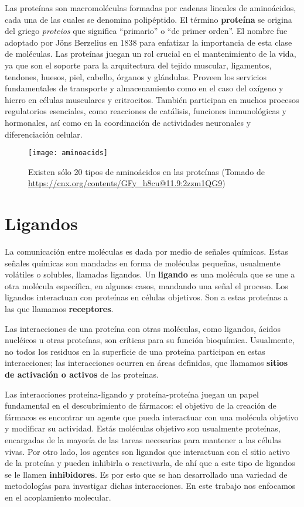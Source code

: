 Las proteínas son macromoléculas formadas por cadenas lineales de
aminoácidos, cada una de las cuales se denomina polipéptido. El
término \textbf{proteína} se origina del griego \textit{proteios} que
significa ``primario'' o ``de primer orden''. El nombre fue adoptado
por Jöns Berzelius en 1838 para enfatizar la importancia de esta clase
de moléculas. Las proteínas juegan un rol crucial en el mantenimiento
de la vida, ya que son el soporte para la arquitectura del tejido
muscular, ligamentos, tendones, huesos, piel, cabello, órganos y
glándulas. Proveen los servicios fundamentales de transporte y
almacenamiento como en el caso del oxígeno y hierro en células
musculares y eritrocitos. También participan en muchos procesos
regulatorios esenciales, como reacciones de catálisis, funciones
inmunológicas y hormonales, así como en la coordinación de actividades
neuronales y diferenciación celular.\cite{tamar}

\begin{figure}[H]
  \texttt{[image: aminoacids]} \centering
  \caption{Existen sólo 20 tipos de aminoácidos en las proteínas
  (Tomado de \url{https://cnx.org/contents/GFy_h8cu@11.9:2zzm1QG9})}
\end{figure}

\section{Ligandos}
La comunicación entre moléculas es dada por medio de señales químicas.
Estas señales químicas son mandadas en forma de moléculas pequeñas,
usualmente volátiles o solubles, llamadas ligandos.
Un \textbf{ligando} es una molécula que se une a otra molécula
específica, en algunos casos, mandando una señal el proceso. Los
ligandos interactuan con proteínas en células objetivos.  Son a estas
proteínas a las que llamamos \textbf{receptores}.

Las interacciones de una proteína con otras moléculas, como ligandos,
ácidos nucléicos u otras proteínas, son críticas para su función
bioquímica. Usualmente, no todos los residuos en la superficie de una
proteína participan en estas interacciones; las interacciones ocurren
en áreas definidas, que llamamos \textbf{sitios de activación o
activos} de las proteínas.

Las interacciones proteína-ligando y proteína-proteína juegan un papel
fundamental en el descubrimiento de fármacos: el objetivo de la
creación de fármacos es encontrar un agente que pueda interactuar con
una molécula objetivo y modificar su actividad. Estás moléculas
objetivo son usualmente proteínas, encargadas de la mayoría de las
tareas necesarias para mantener a las células vivas. Por otro lado,
los agentes son ligandos que interactuan con el sitio activo de la
proteína y pueden inhibirla o reactivarla, de ahí que a este tipo de
ligandos se le llamen \textbf{inhibidores}. Es por esto que se han
desarrollado una variedad de metodologías para investigar dichas
interacciones. En este trabajo nos enfocamos en el acoplamiento
molecular.


